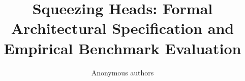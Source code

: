\title{\textbf{Squeezing Heads: Formal Architectural Specification and Empirical Benchmark Evaluation}}

\author{Anonymous authors}
